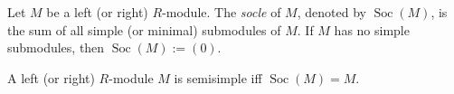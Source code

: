 \documentclass[12pt]{article}
\begin{document}
Let $M$ be a left (or right) $R$-module. The \emph{socle} of $M$, denoted by $\operatorname{Soc}(M)$, is the sum of all simple (or minimal) submodules of $M$.  If $M$ has no simple submodules, then $\operatorname{Soc}(M):=(0)$.

A left (or right) $R$-module $M$ is semisimple iff $\operatorname{Soc}(M)=M$.
\end{document}
